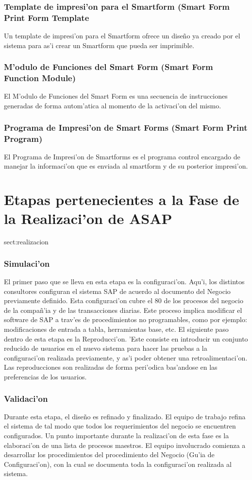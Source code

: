 \subsubsection{Template de impresi'on para el Smartform (Smart Form Print Form Template}
	Un template de impresi'on para el Smartform ofrece un dise\~no ya creado por el sistema para as'i crear un Smartform que pueda ser imprimible.
\subsubsection{M'odulo de Funciones del Smart Form (Smart Form Function Module)}
	El M'odulo de Funciones del Smart Form es una secuencia de instrucciones generadas de forma autom'atica al momento de la activaci'on del  mismo.
\subsubsection{Programa de Impresi'on de Smart Forms (Smart Form Print Program)}
	El Programa de Impresi'on de Smartforms es el programa control encargado de manejar la informaci'on que es enviada al smartform y de su posterior impresi'on. 
\section{Etapas pertenecientes a la Fase de la Realizaci'on de ASAP}{sect:realizacion}
\subsubsection{Simulaci'on}
	El primer paso que se lleva en esta etapa es la configuraci'on. Aqu'i, los distintos consultores configuran el sistema SAP de acuerdo al documento del Negocio previamente definido.  Esta configuraci'on cubre el 80 de los procesos del negocio de la compa\~n'ia y de las transacciones diarias. Este proceso implica modificar el software de SAP a trav'es de procedimientos no programables, como por ejemplo:  modificaciones de entrada a tabla, herramientas base, etc.
	El siguiente paso dentro de esta etapa es la Reproducci'on. 'Este consiste en introducir un conjunto reducido de usuarios en el nuevo sistema para hacer las pruebas a la configuraci'on realizada previamente, y as'i poder obtener una retroalimentaci'on. Las reproducciones son realizadas de forma peri'odica bas'andose en las preferencias de los usuarios. 
	
\subsubsection{Validaci'on}
	Durante esta etapa, el dise\~no es refinado y finalizado. El equipo de trabajo refina el sistema de tal modo que todos los requerimientos del negocio se encuentren configurados. 
	Un punto importante durante la realizaci'on de esta fase es la elaboraci'on de una lista de procesos maestros. 	El equipo involucrado comienza a desarrollar los procedimientos del procedimiento del Negocio (Gu'ia de Configuraci'on), con la cual se documenta toda la configuraci'on realizada al sistema. 
